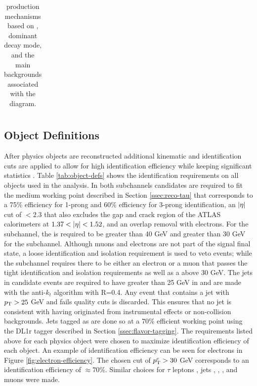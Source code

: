 \begin{table}[!thp]
{\begin{tabular}{| c | c | c | c |}
			\end{tabular}}
			\caption{\Hpm production mechanisms based on \mHpm, dominant \Hpm decay mode, and the main backgrounds associated with the diagram.}
			\label{tab:hplus-production}
		\end{table}

		\subsection{Object Definitions}\label{ssec:object-def}
			After physics objects are reconstructed additional kinematic and identification cuts are applied to allow for high identification efficiency while keeping significant statistics \cites{tau-id-rnn}{jet-calibration}{b-tagging}{electron-perf}{muon-id}. Table \ref{tab:object-defs} shows the identification requirements on all objects used in the analysis. In both subchannels \tauhad candidates are required to fit the medium working point described in Section \ref{ssec:reco-tau} that corresponds to a 75\% efficiency for 1-prong and 60\% efficiency for 3-prong \tauhad identification, an $|{\eta}|$ cut of $< 2.3$ that also excludes the gap and crack region of the ATLAS calorimeters at $1.37 < |{\eta}| < 1.52$, and an overlap removal with electrons. For the \taujets subchannel, the \tauhad \pt is required to be greater than 40 GeV and greater than 30 GeV for the \taulep subchannel. Although muons and electrons are not part of the \taujets signal final state, a loose identification and isolation requirement is used to veto events; while the \taulep subchannel requires there to be either an electron or a muon that passes the tight identification and isolation requirements as well as a \pt above 30 GeV. The jets in candidate events are required to have greater than 25 GeV in \pt and are made with the anti-$k_t$ algorithm with R=0.4. Any event that contains a jet with $p_{\text{T}} > 25$ GeV and fails quality cuts is discarded. This ensures that no jet is consistent with having originated from instrumental effects or non-collision backgrounds. Jets tagged as \bjets are done so at a 70\% efficient working point using the DL1r tagger described in Section \ref{ssec:flavor-tagging}. The \pt requirements listed above for each physics object were chosen to maximize identification efficiency of each object. An example of identification efficiency can be seen for electrons in Figure \ref{fig:electron-efficiency}. The chosen cut of $p_{\text{T}}^{e}>30$ GeV corresponds to an identification efficiency of $\approx 70\%$. Similar choices for $\tau$ leptons \cite{tau-id-rnn}, jets \cite{jet-calibration}, \bjets \cite{b-tagging}, \Etm \cite{met-perf}, and muons \cite{muon-calibration} were made. 

